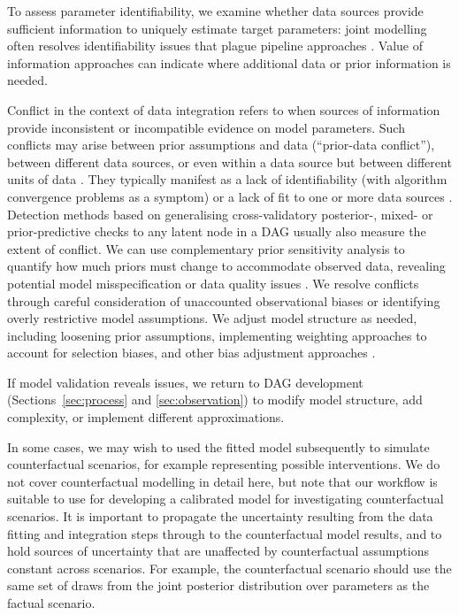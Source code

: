 \documentclass{article}
\begin{document}
To assess parameter identifiability, we examine whether data sources provide sufficient information to uniquely estimate target parameters: joint modelling often resolves identifiability issues that plague pipeline approaches \citep{lison2024generative, russell2024combined}. Value of information approaches \citep{jackson2019value,heath2024value} can indicate where additional data or prior information is needed.  

Conflict in the context of data integration refers to when sources of information provide inconsistent or incompatible evidence on model parameters. Such conflicts may arise between prior assumptions and data (``prior-data conflict''), between different data sources, or even within a data source but between different units of data \citep{presanis2013conflict,yang2025detecting}.
They typically manifest as a lack of identifiability (with algorithm convergence problems as a symptom) or a lack of fit to one or more data sources \citep{presanis2013conflict,deangelis2018analysing}. Detection methods based on generalising cross-validatory posterior-, mixed- or prior-predictive checks to any latent node in a DAG \citep{presanis2013conflict,yang2025detecting} usually also measure the extent of conflict. We can use complementary prior sensitivity analysis to quantify how much priors must change to accommodate observed data, revealing potential model misspecification or data quality issues \citep{Roos2015, Kallioinen2024, yang2025detecting}. We resolve conflicts through careful consideration of unaccounted observational biases or identifying overly restrictive model assumptions. We adjust model structure as needed, including loosening prior assumptions, implementing weighting approaches to account for selection biases, and other bias adjustment approaches \citep{deangelis2018analysing}.

If model validation reveals issues, we return to \ac{DAG} development (Sections~\ref{sec:process} and \ref{sec:observation}) to modify model structure, add complexity, or implement different approximations.

In some cases, we may wish to used the fitted model subsequently to simulate counterfactual scenarios, for example representing possible interventions. We do not cover counterfactual modelling in detail here, but note that our workflow is suitable to use for developing a calibrated model for investigating counterfactual scenarios. It is important to propagate the uncertainty resulting from the data fitting and integration steps through to the counterfactual model results, and to hold sources of uncertainty that are unaffected by counterfactual assumptions constant across scenarios. For example, the counterfactual scenario should use the same set of draws from the joint posterior distribution over parameters as the factual scenario. 
\end{document}
